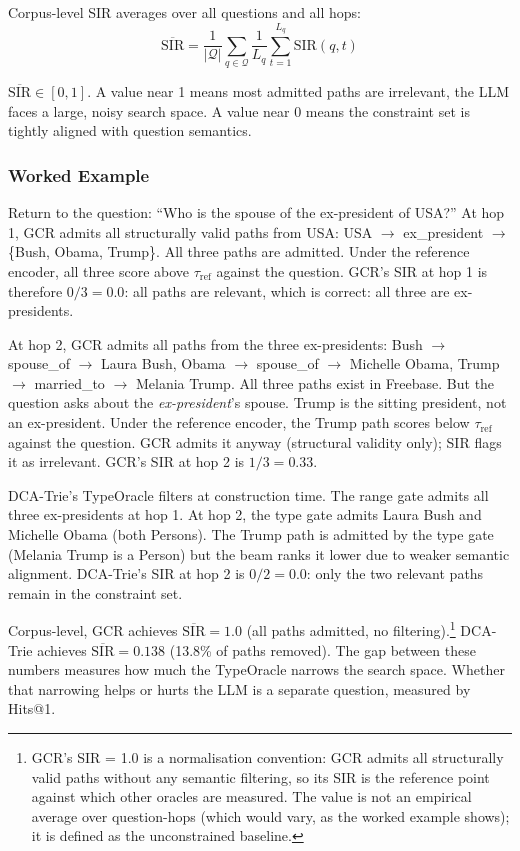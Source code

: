 Corpus-level SIR averages over all questions and all hops:
\begin{equation}
  \overline{\text{SIR}} = \frac{1}{|\mathcal{Q}|} \sum_{q \in \mathcal{Q}}
  \frac{1}{L_q} \sum_{t=1}^{L_q} \text{SIR}(q, t)
  \label{eq:sir_corpus}
\end{equation}

$\overline{\text{SIR}} \in [0, 1]$. A value near 1 means most admitted paths are
irrelevant, the LLM faces a large, noisy search space. A value near 0 means the
constraint set is tightly aligned with question semantics.

\subsubsection{Worked Example}

Return to the question: ``Who is the spouse of the ex-president of USA?'' At hop 1,
GCR admits all structurally valid paths from USA: USA $\to$ ex\_president $\to$ \{Bush,
Obama, Trump\}. All three paths are admitted. Under the reference encoder, all three
score above $\tau_{\text{ref}}$ against the question. GCR's SIR at hop 1 is therefore
$0/3 = 0.0$: all paths are relevant, which is correct: all three are ex-presidents.

At hop 2, GCR admits all paths from the three ex-presidents: Bush $\to$ spouse\_of
$\to$ Laura Bush, Obama $\to$ spouse\_of $\to$ Michelle Obama, Trump $\to$ married\_to
$\to$ Melania Trump. All three paths exist in Freebase. But the question asks about the
\textit{ex-president}'s spouse. Trump is the sitting president, not an ex-president.
Under the reference encoder, the Trump path scores below $\tau_{\text{ref}}$ against the
question. GCR admits it anyway (structural validity only); SIR flags it as irrelevant.
GCR's SIR at hop 2 is $1/3 = 0.33$.

DCA-Trie's TypeOracle filters at construction time. The range gate admits all three
ex-presidents at hop 1. At hop 2, the type gate admits Laura Bush and Michelle Obama
(both Persons). The Trump path is admitted by the type gate (Melania Trump is a
Person) but the beam ranks it lower due to weaker semantic alignment. DCA-Trie's SIR at
hop 2 is $0/2 = 0.0$: only the two relevant paths remain in the constraint set.

Corpus-level, GCR achieves $\overline{\text{SIR}} = 1.0$ (all paths admitted, no
filtering).\footnote{GCR's SIR = 1.0 is a normalisation convention: GCR admits all
structurally valid paths without any semantic filtering, so its SIR is the
reference point against which other oracles are measured. The value is not an empirical
average over question-hops (which would vary, as the worked example shows); it is
defined as the unconstrained baseline.} DCA-Trie achieves
$\overline{\text{SIR}} = 0.138$ (13.8\% of paths removed). The gap between
these numbers measures how much the TypeOracle narrows the search space. Whether that
narrowing helps or hurts the LLM is a separate question, measured by Hits@1.

